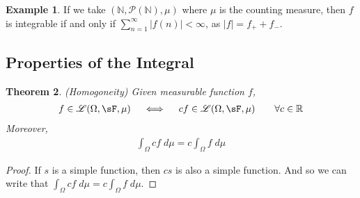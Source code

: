 \documentclass[12pt]{article}
\theoremstyle{plain}
\newtheorem{thm}{Theorem}[section]
\theoremstyle{definition}
\newtheorem{ex}[thm]{Example}
\theoremstyle{remark}
\begin{document}
\begin{ex}
If we take $(\mathbb{N}, \mathscr{P}(\mathbb{N}), \mu)$ where $\mu$ is
the counting measure, then $f$ is integrable if and only if
$\sum^\infty_{n=1}|f(n)|<\infty$, as $|f| = f_+ + f_-$.
\end{ex}

\clearpage
\subsection{Properties of the Integral}

\begin{thm}\emph{(Homogoneity)}
Given measurable function $f$,
\begin{align*}
  f\in\mathscr{L}(\Omega,\sF,\mu)
  \quad\iff\quad
  cf\in\mathscr{L}(\Omega,\sF,\mu)
  \qquad\forall c\in\mathbb{R}
\end{align*}
Moreover,
\begin{align*}
  \int_\Omega cf\;d\mu = c\int_\Omega f\;d\mu
\end{align*}
\end{thm}
\begin{proof}
If $s$ is a simple function, then $cs$ is also a simple function. And so
we can write that $\int_\Omega cf \; d\mu = c\int_\Omega f \; d\mu$.
\end{proof}
\end{document}
